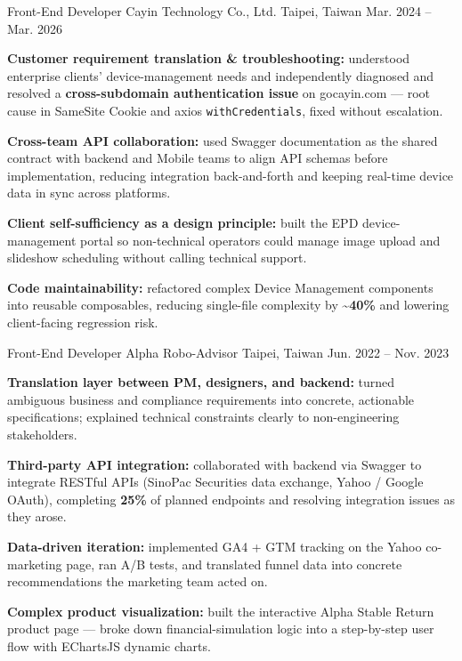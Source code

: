 
\begin{cventries}

\cventry
  {Front-End Developer}
  {Cayin Technology Co., Ltd.}
  {Taipei, Taiwan}
  {Mar. 2024 -- Mar. 2026}
  {
    \begin{cvitems}
      \item {\textbf{Customer requirement translation \& troubleshooting:} understood enterprise clients' device-management needs and independently diagnosed and resolved a \textbf{cross-subdomain authentication issue} on gocayin.com — root cause in SameSite Cookie and axios \texttt{withCredentials}, fixed without escalation.}
      \item {\textbf{Cross-team API collaboration:} used Swagger documentation as the shared contract with backend and Mobile teams to align API schemas before implementation, reducing integration back-and-forth and keeping real-time device data in sync across platforms.}
      \item {\textbf{Client self-sufficiency as a design principle:} built the EPD device-management portal so non-technical operators could manage image upload and slideshow scheduling without calling technical support.}
      \item {\textbf{Code maintainability:} refactored complex Device Management components into reusable composables, reducing single-file complexity by \textbf{\textasciitilde40\%} and lowering client-facing regression risk.}
    \end{cvitems}
  }

  \vspace{1mm}

\cventry
  {Front-End Developer}
  {Alpha Robo-Advisor}
  {Taipei, Taiwan}
  {Jun. 2022 -- Nov. 2023}
  {
    \begin{cvitems}
      \item {\textbf{Translation layer between PM, designers, and backend:} turned ambiguous business and compliance requirements into concrete, actionable specifications; explained technical constraints clearly to non-engineering stakeholders.}
      \item {\textbf{Third-party API integration:} collaborated with backend via Swagger to integrate RESTful APIs (SinoPac Securities data exchange, Yahoo / Google OAuth), completing \textbf{25\%} of planned endpoints and resolving integration issues as they arose.}
      \item {\textbf{Data-driven iteration:} implemented GA4 + GTM tracking on the Yahoo co-marketing page, ran A/B tests, and translated funnel data into concrete recommendations the marketing team acted on.}
      \item {\textbf{Complex product visualization:} built the interactive Alpha Stable Return product page — broke down financial-simulation logic into a step-by-step user flow with EChartsJS dynamic charts.}
    \end{cvitems}
  }


\end{cventries}
